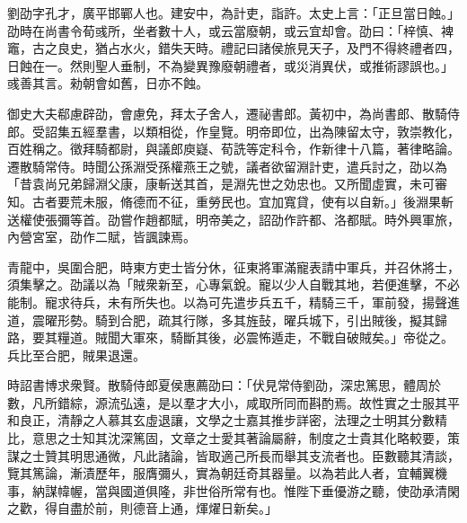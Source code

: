 \begin{pinyinscope}
 
 
 劉劭字孔才，廣平邯鄲人也。建安中，為計吏，詣許。太史上言：「正旦當日蝕。」劭時在尚書令荀彧所，坐者數十人，或云當廢朝，或云宜却會。劭曰：「梓慎、裨竈，古之良史，猶占水火，錯失天時。禮記曰諸侯旅見天子，及門不得終禮者四，日蝕在一。然則聖人垂制，不為變異豫廢朝禮者，或災消異伏，或推術謬誤也。」彧善其言。勑朝會如舊，日亦不蝕。
 
 
 
 
 
 
 御史大夫郗慮辟劭，會慮免，拜太子舍人，遷祕書郎。黃初中，為尚書郎、散騎侍郎。受詔集五經羣書，以類相從，作皇覽。明帝即位，出為陳留太守，敦崇教化，百姓稱之。徵拜騎都尉，與議郎庾嶷、荀詵等定科令，作新律十八篇，著律略論。遷散騎常侍。時聞公孫淵受孫權燕王之號，議者欲留淵計吏，遣兵討之，劭以為「昔袁尚兄弟歸淵父康，康斬送其首，是淵先世之効忠也。又所聞虛實，未可審知。古者要荒未服，脩德而不征，重勞民也。宜加寬貸，使有以自新。」後淵果斬送權使張彌等首。劭嘗作趙都賦，明帝美之，詔劭作許都、洛都賦。時外興軍旅，內營宮室，劭作二賦，皆諷諫焉。
 
 
 
 
 青龍中，吳圍合肥，時東方吏士皆分休，征東將軍滿寵表請中軍兵，并召休將士，須集擊之。劭議以為「賊衆新至，心專氣銳。寵以少人自戰其地，若便進擊，不必能制。寵求待兵，未有所失也。以為可先遣步兵五千，精騎三千，軍前發，揚聲進道，震曜形勢。騎到合肥，疏其行隊，多其旌鼔，曜兵城下，引出賊後，擬其歸路，要其糧道。賊聞大軍來，騎斷其後，必震怖遁走，不戰自破賊矣。」帝從之。兵比至合肥，賊果退還。
 
 
時詔書博求衆賢。散騎侍郎夏侯惠薦劭曰：「伏見常侍劉劭，深忠篤思，體周於數，凡所錯綜，源流弘遠，是以羣才大小，咸取所同而斟酌焉。故性實之士服其平和良正，清靜之人慕其玄虛退讓，文學之士嘉其推步詳密，法理之士明其分數精比，意思之士知其沈深篤固，文章之士愛其著論屬辭，制度之士貴其化略較要，策謀之士贊其明思通微，凡此諸論，皆取適己所長而舉其支流者也。臣數聽其清談，覽其篤論，漸漬歷年，服膺彌乆，實為朝廷奇其器量。以為若此人者，宜輔翼機事，納謀幃幄，當與國道俱隆，非世俗所常有也。惟陛下垂優游之聽，使劭承清閑之歡，得自盡於前，則德音上通，煇燿日新矣。」
 

\end{pinyinscope}

